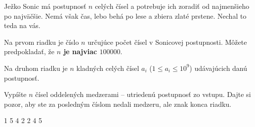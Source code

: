 




Ježko Sonic má postupnosť $n$ celých čísel a potrebuje ich zoradiť od najmenšieho po najväčšie. Nemá
však čas, lebo behá po lese a zbiera zlaté prstene. Nechal to teda na vás.


Na prvom riadku je číslo $n$ určujúce počet čísel v Sonicovej postupnosti. Môžete predpokladať, že
\textbf{$n$ je najviac $100000$}.

Na druhom riadku je $n$ kladných celých čísel $a_i$ ($1 \leq a_i \leq 10^9$) udávajúcich danú
postupnosť.


Vypíšte $n$ čísel oddelených medzerami -- utriedenú postupnosť zo vstupu. Dajte si pozor, aby ste
za posledným číslom nedali medzeru, ale znak konca riadku.


1 5 4 2
 2 4 5
\koniec


